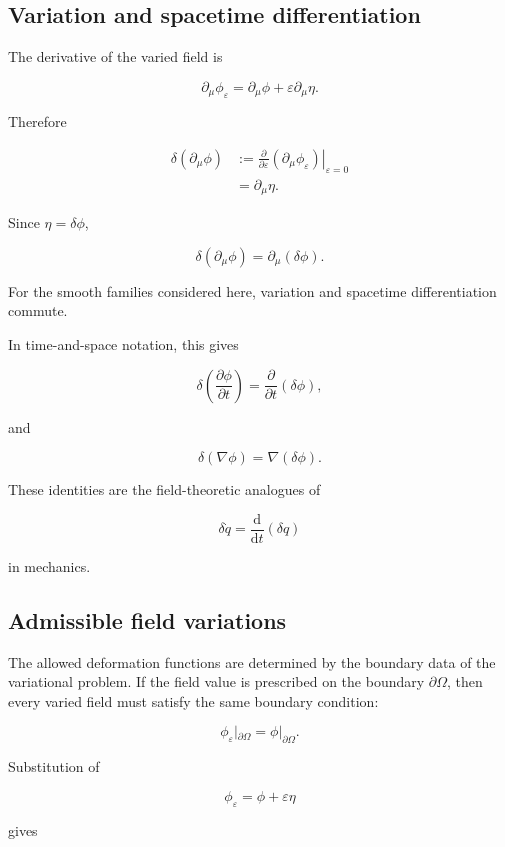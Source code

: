 \subsection{Variation and spacetime differentiation}

The derivative of the varied field is

\[
\partial_{\mu}\phi_{\varepsilon}
=
\partial_{\mu}\phi
+
\varepsilon\partial_{\mu}\eta.
\]

Therefore

\[
\begin{aligned}
\delta(\partial_{\mu}\phi)
&:=
\left.
\frac{\partial}{\partial\varepsilon}
(\partial_{\mu}\phi_{\varepsilon})
\right|_{\varepsilon=0}\\
&=
\partial_{\mu}\eta.
\end{aligned}
\]

Since \(\eta=\delta\phi\),

\[
\boxed{
\delta(\partial_{\mu}\phi)
=
\partial_{\mu}(\delta\phi)
}.
\]

For the smooth families considered here, variation and spacetime differentiation commute.

In time-and-space notation, this gives

\[
\delta\left(\frac{\partial\phi}{\partial t}\right)
=
\frac{\partial}{\partial t}(\delta\phi),
\]

and

\[
\delta(\nabla\phi)
=
\nabla(\delta\phi).
\]

These identities are the field-theoretic analogues of

\[
\delta\dot q
=
\frac{\mathrm{d}}{\mathrm{d}t}(\delta q)
\]

in mechanics.

\subsection{Admissible field variations}

The allowed deformation functions are determined by the boundary data of the variational problem. If the field value is prescribed on the boundary \(\partial\Omega\), then every varied field must satisfy the same boundary condition:

\[
\phi_{\varepsilon}|_{\partial\Omega}
=
\phi|_{\partial\Omega}.
\]

Substitution of

\[
\phi_{\varepsilon}
=
\phi+\varepsilon\eta
\]

gives

